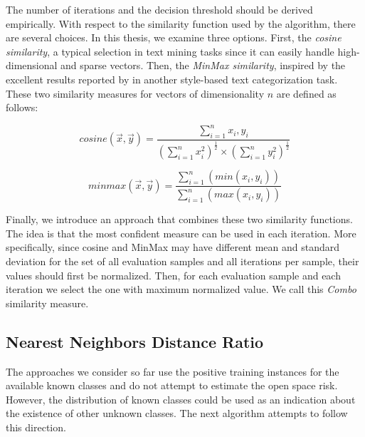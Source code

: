 The number of iterations and the decision threshold should be derived empirically. With respect to the similarity function used by the algorithm, there are several choices. In this thesis, we examine three options. First, the \textit{cosine similarity}, a typical selection in text mining tasks since it can easily handle high-dimensional and sparse vectors. Then, the \textit{MinMax similarity}, inspired by the excellent results reported by \parencite{koppel2014determining} in another style-based text categorization task. These two similarity measures for vectors of dimensionality $n$ are defined as follows:

\begin{equation}
\label{eq:cosine}
cosine(\vec{x},\vec{y})= \frac{\displaystyle \sum_{i=1}^{n} x_i,y_i}{(\displaystyle \sum_{i=1}^{n} x_i^2)^\frac{1}{2}×(\displaystyle \sum_{i=1}^{n} y_i^2)^\frac{1}{2}}
\end{equation}

\begin{equation}
\label{eq:minmax}
minmax(\vec{x},\vec{y})=\frac{\displaystyle \sum_{i=1}^{n}(min(x_i,y_i))}{\displaystyle \sum_{i=1}^{n} (max(x_i,y_i))}	\end{equation}

Finally, we introduce an approach that combines these two similarity functions. The idea is that the most confident measure can be used in each iteration. More specifically, since cosine and MinMax may have different mean and standard deviation for the set of all evaluation samples and all iterations per sample, their values should first be normalized. Then, for each evaluation sample and each iteration we select the one with maximum normalized value. We call this \textit{Combo} similarity measure.

\subsection{Nearest Neighbors Distance Ratio}\label{chap:openset:sec:NNRD_Description}

The approaches we consider so far use the positive training instances for the available known classes and do not attempt to estimate the open space risk. However, the distribution of known classes could be used as an indication about the existence of other unknown classes. The next algorithm attempts to follow this direction.


